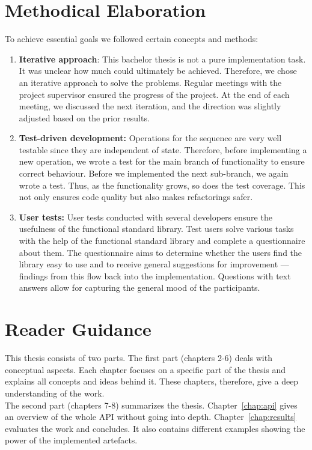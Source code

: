 \section*{Methodical Elaboration} %
\label{sec:intro_methoical_elaboration}
To achieve essential goals we followed certain concepts and methods:
\begin{enumerate}
  \item \textbf{Iterative approach}: This bachelor thesis is not a pure
    implementation task. It was unclear how much could ultimately be achieved.
    Therefore, we chose an iterative approach to solve the problems. Regular
    meetings with the project supervisor ensured the progress of the project.
    At the end of each meeting, we discussed the next iteration, and the
    direction was slightly adjusted based on the prior results.
  \item \textbf{Test-driven development:} Operations for the sequence are very
    well testable since they are independent of state. Therefore, before
    implementing a new operation, we wrote a test for the main branch of
    functionality to ensure correct behaviour. Before we implemented the next
    sub-branch, we again wrote a test. Thus, as the functionality grows, so
    does the test coverage. This not only ensures code quality but also makes
    refactorings safer.
    \item  \textbf{User tests:} User tests conducted
    with several developers ensure the usefulness of the functional standard
    library. Test users solve various tasks with the help of the functional
    standard library and complete a questionnaire about them. The questionnaire
    aims to determine whether the users find the library easy to use and to
    receive general suggestions for improvement — findings from this flow back
    into the implementation. Questions with text answers allow for capturing the
    general mood of the participants.
\end{enumerate}

\section*{Reader Guidance} %
\label{sec:Reader Guidance}
This thesis consists of two parts. The first part (chapters 2-6) deals with
conceptual aspects. Each chapter focuses on a specific part of the thesis and
explains all concepts and ideas behind it. These chapters, therefore, give a
deep understanding of the work.\\
The second part (chapters 7-8) summarizes the thesis. Chapter~\ref{chap:api}
gives an overview of the whole API without going into depth.
Chapter~\ref{chap:results} evaluates the work and concludes. It also contains
different examples showing the power of the implemented artefacts.
